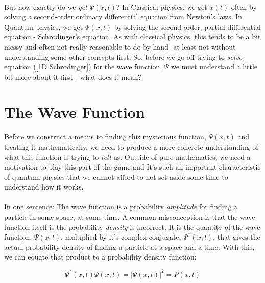 \documentclass[12pt,letterpaper]{book}
\begin{document}
\paragraph*{}But how exactly do we \textit{get} $\Psi(x,t)$? In Classical physics, we get $x(t)$ often by solving a second-order ordinary differential equation from Newton's laws. In Quantum physics, we get $\Psi(x,t)$ by solving the second-order, partial differential equation - Schrodinger's equation. As with classical physics, this tends to be a bit messy and often not really reasonable to do by hand- at least not without understanding some other concepts first. So, before we go off trying to \textit{solve} equation (\ref{1D Schrodinger}) for the wave function, $\Psi$ we must understand a little bit more about it first - what does it mean?



\section{The Wave Function}

\paragraph*{}Before we construct a means to finding this mysterious function, $\Psi(x,t)$ and treating it mathematically, we need to produce a more concrete understanding of what this function is trying to \textit{tell} us. Outside of pure mathematics, we need a motivation to play this part of the game and It's such an important characteristic of quantum physics that we cannot afford to not set aside some time to understand how it works.

\paragraph*{}In one sentence: The wave function is a probability \textit{amplitude} for finding a particle in some space, at some time. A common misconception is that the wave function itself is the probability \textit{density} is incorrect. It is the quantity of the wave function, $\Psi(x,t)$, multiplied by it's complex conjugate, $\Psi^*(x,t)$, that gives the actual probability density of finding a particle at a space and a time. With this, we can equate that product to a probability density function:

\begin{equation}
\label{prob density func}
\Psi^*(x,t) \Psi(x,t) = \big | \Psi(x,t) \big|^2 = P(x,t)
\end{equation}
\end{document}
